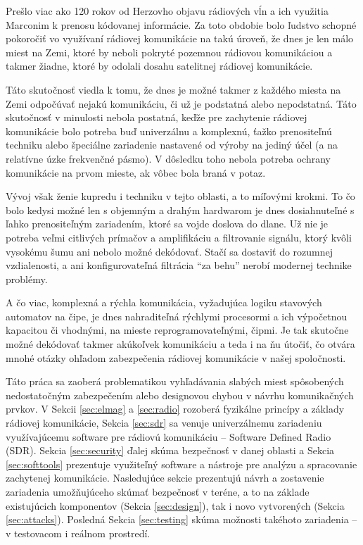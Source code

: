 

Prešlo viac ako 120 rokov od Herzovho objavu rádiových vĺn a ich využitia Marconim
k prenosu kódovanej informácie. Za toto obdobie bolo ľudstvo schopné pokoročiť vo
využívaní rádiovej komunikácie na takú úroveň, že dnes je len málo miest na Zemi,
ktoré by neboli pokryté pozemnou rádiovou komunikáciou a takmer žiadne, ktoré by
odolali dosahu satelitnej rádiovej komunikácie.

Táto skutočnosť viedla k tomu, že dnes je možné takmer z každého miesta na Zemi
odpočúvať nejakú komunikáciu, či už je podstatná alebo nepodstatná. Táto skutočnosť
v minulosti nebola postatná, keďže pre zachytenie rádiovej komunikácie bolo potreba
buď univerzálnu a komplexnú, ťažko prenositeľnú techniku alebo špeciálne zariadenie
nastavené od výroby na jediný účel (a na relatívne úzke frekvenčné pásmo). V dôsledku
toho nebola potreba ochrany komunikácie na prvom mieste, ak vôbec bola braná v potaz.

Vývoj však ženie kupredu i techniku v tejto oblasti, a to míľovými krokmi. To čo bolo
kedysi možné len s objemným a drahým hardwarom je dnes dosiahnuteľné s ľahko prenositeľným
zariadením, ktoré sa vojde doslova do dlane. Už nie je potreba veľmi citlivých prímačov a 
amplifikáciu a filtrovanie signálu, ktorý kvôli vysokému šumu ani nebolo možné dekódovať. 
Stačí sa dostaviť do rozumnej vzdialenosti, a ani konfigurovateľná filtrácia ``za behu''
nerobí modernej technike problémy.

A čo viac, komplexná a rýchla komunikácia, vyžadujúca logiku stavových automatov na čipe, 
je dnes nahraditeľná rýchlymi procesormi a ich výpočetnou kapacitou či vhodnými, na mieste
reprogramovateľnými, čipmi. Je tak skutočne možné dekódovať takmer akúkoľvek komunikáciu
a teda i na ňu útočiť, čo otvára mnohé otázky ohľadom zabezpečenia rádiovej komunikácie v
našej spoločnosti.

Táto práca sa zaoberá problematikou vyhľadávania slabých miest spôsobených nedostatočným
zabezpečením alebo designovou chybou v návrhu komunikačných prvkov. V Sekcii \ref{sec:elmag} a \ref{sec:radio} rozoberá fyzikálne princípy a základy rádiovej komunikácie, Sekcia \ref{sec:sdr} sa venuje univerzálnemu zariadeniu využívajúcemu software pre rádiovú komunikáciu -- Software Defined Radio (SDR). Sekcia \ref{sec:security} ďalej skúma bezpečnosť v danej oblasti a Sekcia \ref{sec:softtools} prezentuje využiteľný software a nástroje pre analýzu a spracovanie zachytenej komunikácie. Nasledujúce sekcie prezentujú návrh a zostavenie zariadenia umožňujúceho skúmať bezpečnosť v teréne, a to na základe existujúcich komponentov (Sekcia \ref{sec:design}), tak i novo vytvorených (Sekcia \ref{sec:attacks}). Posledná Sekcia \ref{sec:testing} skúma možnosti takéhoto zariadenia -- v testovacom i reálnom prostredí.


